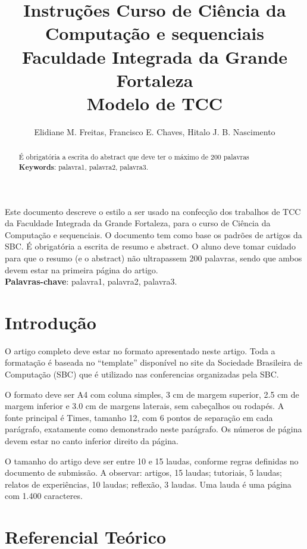 \documentclass[12pt]{article}
\title{Instruções Curso de Ciência da Computação e sequenciais\\ Faculdade Integrada da Grande Fortaleza\\Modelo de TCC}
\author{Elidiane M. Freitas\inst{1}, Francisco E. Chaves\inst{1}, Hitalo J. B. Nascimento\inst{1} }
\begin{document}
 

\maketitle

\begin{resumo}
  Este documento descreve \cite{gama} o estilo a ser usado na confecção dos trabalhos de TCC da Faculdade Integrada da Grande Fortaleza, para o curso de Ciência da Computação e sequenciais. O documento tem como base os padrões de artigos da SBC. É obrigatória a escrita de resumo e abstract. O aluno deve tomar cuidado para que o resumo (e o abstract) não ultrapassem 200 palavras, sendo que ambos devem estar na primeira página do artigo.\\
  \textbf{Palavras-chave}: palavra1, palavra2, palavra3.
\end{resumo}

\begin{abstract} 
  É obrigatória a escrita do abstract que deve ter o máximo de 200 palavras\\
  \textbf{Keywords}: palavra1, palavra2, palavra3.
\end{abstract}

\section{Introdução}

O artigo completo deve estar no formato apresentado neste artigo. Toda a formatação é baseada no “template” disponível no site da Sociedade Brasileira de Computação (SBC) que é utilizado nas conferencias organizadas pela SBC.


O formato deve ser A4 com coluna simples, 3 cm de margem superior, 2.5 cm de margem inferior e 3.0 cm de margens laterais, sem cabeçalhos ou rodapés. A fonte principal é Times, tamanho 12, com 6 pontos de separação em cada parágrafo, exatamente como demonstrado neste parágrafo. Os números de página devem estar no canto inferior direito da página.


O tamanho do artigo deve ser entre 10 e 15 laudas, conforme regras definidas no documento de submissão. A observar: artigos, 15 laudas; tutoriais, 5 laudas; relatos de experiências, 10 laudas; reflexão, 3 laudas. Uma lauda é uma página com 1.400 caracteres.


\section{Referencial Teórico} \label{sec:firstpage}
\end{document}
